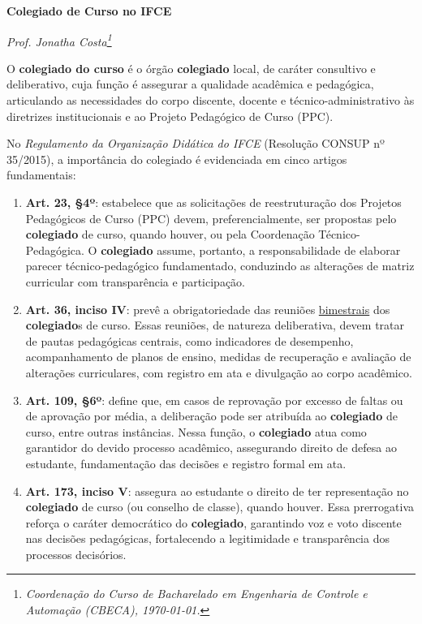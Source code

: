 \documentclass[11pt,a4paper]{article}
\begin{document}
	
	\begin{center}
		\Large \textbf{Colegiado de Curso no IFCE} \\		 
	\end{center}

\begin{flushright}
	\scriptsize \it Prof. Jonatha Costa\footnote{\it Coordenação do Curso de Bacharelado em Engenharia de Controle e Automação (CBECA), \today.}
\end{flushright}

	
	\vspace{0.5cm}
	
	O \textbf{\textbf{colegiado} do curso} é o órgão \textbf{colegiado} local, de caráter consultivo e deliberativo, cuja função é assegurar a qualidade acadêmica e pedagógica, articulando as necessidades do corpo discente, docente e técnico-administrativo às diretrizes institucionais e ao Projeto Pedagógico de Curso (PPC).  
	
	No \textit{Regulamento da Organização Didática do IFCE} (Resolução CONSUP nº 35/2015), a importância do colegiado é evidenciada em cinco artigos fundamentais:
	
	\begin{enumerate}
		\item \textbf{Art. 23, §4º}: estabelece que as solicitações de reestruturação dos Projetos Pedagógicos de Curso (PPC) devem, preferencialmente, ser propostas pelo \textbf{colegiado} de curso, quando houver, ou pela Coordenação Técnico-Pedagógica. O \textbf{colegiado} assume, portanto, a responsabilidade de elaborar parecer técnico-pedagógico fundamentado, conduzindo as alterações de matriz curricular com transparência e participação.
		
		\item \textbf{Art. 36, inciso IV}: prevê a obrigatoriedade das reuniões \underline{bimestrais} dos \textbf{colegiado}s de curso. Essas reuniões, de natureza deliberativa, devem tratar de pautas pedagógicas centrais, como indicadores de desempenho, acompanhamento de planos de ensino, medidas de recuperação e avaliação de alterações curriculares, com registro em ata e divulgação ao corpo acadêmico.
		
		\item \textbf{Art. 109, §6º}: define que, em casos de reprovação por excesso de faltas ou de aprovação por média, a deliberação pode ser atribuída ao \textbf{colegiado} de curso, entre outras instâncias. Nessa função, o \textbf{colegiado} atua como garantidor do devido processo acadêmico, assegurando direito de defesa ao estudante, fundamentação das decisões e registro formal em ata.
		
		\item \textbf{Art. 173, inciso V}: assegura ao estudante o direito de ter representação no \textbf{colegiado} de curso (ou conselho de classe), quando houver. Essa prerrogativa reforça o caráter democrático do \textbf{colegiado}, garantindo voz e voto discente nas decisões pedagógicas, fortalecendo a legitimidade e transparência dos processos decisórios.
		

	\end{enumerate}
	
\end{document}
